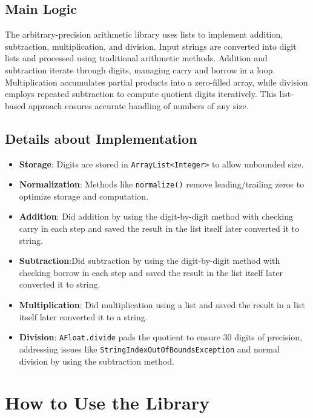 \documentclass[12pt]{article}
\begin{document}
\subsection{Main Logic}
The arbitrary-precision arithmetic library uses lists to implement addition, subtraction, multiplication, and division. Input strings are converted into digit lists and processed using traditional arithmetic methods. Addition and subtraction iterate through digits, managing carry and borrow in a loop. Multiplication accumulates partial products into a zero-filled array, while division employs repeated subtraction to compute quotient digits iteratively. This list-based approach ensures accurate handling of numbers of any size.

\subsection{Details about Implementation}
\begin{itemize}
    \item \textbf{Storage}: Digits are stored in \texttt{ArrayList<Integer>} to allow unbounded size.
    \item \textbf{Normalization}: Methods like \texttt{normalize()} remove leading/trailing zeros to optimize storage and computation.
    \item \textbf{Addition}: Did addition by using the digit-by-digit method with checking carry in each step and saved the result in the list itself later converted it to string.
    \item \textbf{Subtraction}:Did subtraction by using the digit-by-digit method with checking borrow in each step and saved the result in the list itself later converted it to string.
    \item \textbf{Multiplication}: Did multiplication using a list and saved the result in a list itself later converted it to a string.
    \item \textbf{Division}: \texttt{AFloat.divide} pads the quotient to ensure 30 digits of precision, addressing issues like \texttt{StringIndexOutOfBoundsException} and normal division by using the subtraction method.
\end{itemize}

\section{How to Use the Library}
\end{document}
